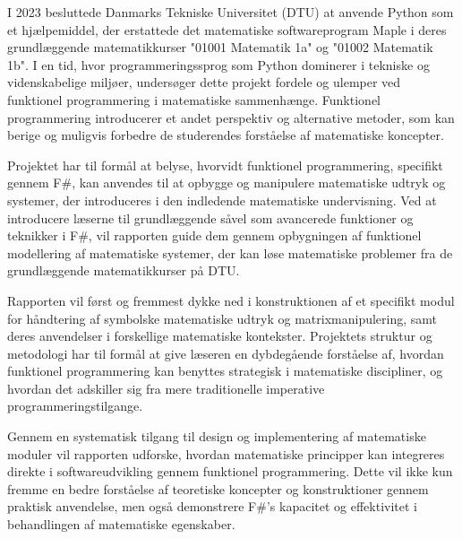 I 2023 besluttede Danmarks Tekniske Universitet (DTU) at anvende Python som et hjælpemiddel, der erstattede det matematiske softwareprogram Maple i deres grundlæggende matematikkurser "01001 Matematik 1a" og "01002 Matematik 1b". I en tid, hvor programmeringssprog som Python dominerer i tekniske og videnskabelige miljøer, undersøger dette projekt fordele og ulemper ved funktionel programmering i matematiske sammenhænge. Funktionel programmering introducerer et andet perspektiv og alternative metoder, som kan berige og muligvis forbedre de studerendes forståelse af matematiske koncepter.

Projektet har til formål at belyse, hvorvidt funktionel programmering, specifikt gennem F\#, kan anvendes til at opbygge og manipulere matematiske udtryk og systemer, der introduceres i den indledende matematiske undervisning. Ved at introducere læserne til grundlæggende såvel som avancerede funktioner og teknikker i F\#, vil rapporten guide dem gennem opbygningen af funktionel modellering af matematiske systemer, der kan løse matematiske problemer fra de grundlæggende matematikkurser på DTU.

Rapporten vil først og fremmest dykke ned i konstruktionen af et specifikt modul for håndtering af symbolske matematiske udtryk og matrixmanipulering, samt deres anvendelser i forskellige matematiske kontekster. Projektets struktur og metodologi har til formål at give læseren en dybdegående forståelse af, hvordan funktionel programmering kan benyttes strategisk i matematiske discipliner, og hvordan det adskiller sig fra mere traditionelle imperative programmeringstilgange.

Gennem en systematisk tilgang til design og implementering af matematiske moduler vil rapporten udforske, hvordan matematiske principper kan integreres direkte i softwareudvikling gennem funktionel programmering. Dette vil ikke kun fremme en bedre forståelse af teoretiske koncepter og konstruktioner gennem praktisk anvendelse, men også demonstrere F\#'s kapacitet og effektivitet i behandlingen af matematiske egenskaber.
